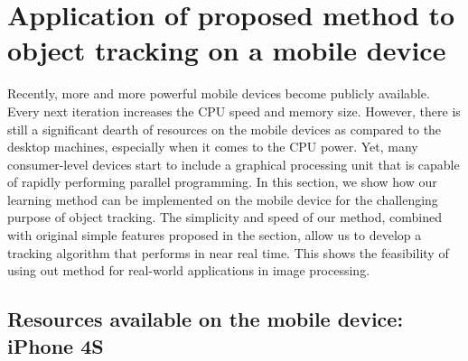 \ifpdf
    \graphicspath{{4/figures/PNG/}{4/figures/PDF/}{4/figures/}}
\else
    \graphicspath{{4/figures/EPS/}{4/figures/}}
\fi

\chapter{Application of proposed method to object tracking on a mobile device} %

Recently, more and more powerful mobile devices become publicly available. Every next iteration increases the CPU speed and memory size. However, there is still a significant dearth of resources on the mobile devices as compared to the desktop machines, especially when it comes to the CPU power. Yet, many consumer-level devices start to include a graphical processing unit that is capable of rapidly performing parallel programming. In this section, we show how our learning method can be implemented on the mobile device for the challenging purpose of object tracking. The simplicity and speed of our method, combined with original simple features proposed in the section, allow us to develop a tracking algorithm that performs in near real time. This shows the feasibility of using out method for real-world applications in image processing.
\section{Resources available on the mobile device: iPhone 4S}
